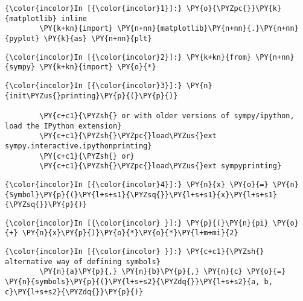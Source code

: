     




    \begin{Verbatim}[commandchars=\\\{\}]
{\color{incolor}In [{\color{incolor}1}]:} \PY{o}{\PYZpc{}}\PY{k}{matplotlib} inline
        \PY{k+kn}{import} \PY{n+nn}{matplotlib}\PY{n+nn}{.}\PY{n+nn}{pyplot} \PY{k}{as} \PY{n+nn}{plt}
\end{Verbatim}





    \begin{Verbatim}[commandchars=\\\{\}]
{\color{incolor}In [{\color{incolor}2}]:} \PY{k+kn}{from} \PY{n+nn}{sympy} \PY{k+kn}{import} \PY{o}{*}
\end{Verbatim}



    \begin{Verbatim}[commandchars=\\\{\}]
{\color{incolor}In [{\color{incolor}3}]:} \PY{n}{init\PYZus{}printing}\PY{p}{(}\PY{p}{)}
        
        \PY{c+c1}{\PYZsh{} or with older versions of sympy/ipython, load the IPython extension}
        \PY{c+c1}{\PYZsh{}\PYZpc{}load\PYZus{}ext sympy.interactive.ipythonprinting}
        \PY{c+c1}{\PYZsh{} or}
        \PY{c+c1}{\PYZsh{}\PYZpc{}load\PYZus{}ext sympyprinting}
\end{Verbatim}





    \begin{Verbatim}[commandchars=\\\{\}]
{\color{incolor}In [{\color{incolor}4}]:} \PY{n}{x} \PY{o}{=} \PY{n}{Symbol}\PY{p}{(}\PY{l+s+s1}{\PYZsq{}}\PY{l+s+s1}{x}\PY{l+s+s1}{\PYZsq{}}\PY{p}{)}
\end{Verbatim}

    \begin{Verbatim}[commandchars=\\\{\}]
{\color{incolor}In [{\color{incolor} }]:} \PY{p}{(}\PY{n}{pi} \PY{o}{+} \PY{n}{x}\PY{p}{)}\PY{o}{*}\PY{o}{*}\PY{l+m+mi}{2}
\end{Verbatim}

    \begin{Verbatim}[commandchars=\\\{\}]
{\color{incolor}In [{\color{incolor} }]:} \PY{c+c1}{\PYZsh{} alternative way of defining symbols}
        \PY{n}{a}\PY{p}{,} \PY{n}{b}\PY{p}{,} \PY{n}{c} \PY{o}{=} \PY{n}{symbols}\PY{p}{(}\PY{l+s+s2}{\PYZdq{}}\PY{l+s+s2}{a, b, c}\PY{l+s+s2}{\PYZdq{}}\PY{p}{)}
\end{Verbatim}

